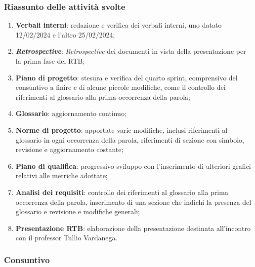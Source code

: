 \subsubsection{Riassunto delle attività svolte}
\begin{enumerate}
	\item \textbf{Verbali interni}: redazione e verifica dei verbali interni, uno datato 12/02/2024 e l'altro 25/02/2024;

	\item \textit{\textbf{Retrospective}}: \textit{Retrospective}  dei documenti in vista della presentazione per la prima fase del RTB;

	\item \textbf{Piano di progetto}: stesura e verifica del quarto sprint, comprensivo del consuntivo a finire e di alcune piccole modifiche, 
			come il controllo dei riferimenti al glossario alla prima occorrenza della parola;

	\item \textbf{Glossario}: aggiornamento continuo;
	
	\item \textbf{Norme di progetto}: apportate varie modifiche, inclusi riferimenti al glossario in ogni occorrenza della parola, 
			riferimenti di sezione con simbolo, revisione e aggiornamento costante;

	\item \textbf{Piano di qualifica}: progressivo sviluppo con l'inserimento di ulteriori grafici relativi alle metriche adottate;

	\item \textbf{Analisi dei requisiti}: controllo dei riferimenti al glossario alla prima occorrenza della parola, inserimento di una sezione che indichi la presenza del glossario e revisione e modifiche generali;

	\item \textbf{Presentazione RTB}: elaborazione della presentazione destinata all'incontro con il professor Tullio Vardanega.		
\end{enumerate}

\subsubsection{Consuntivo}

